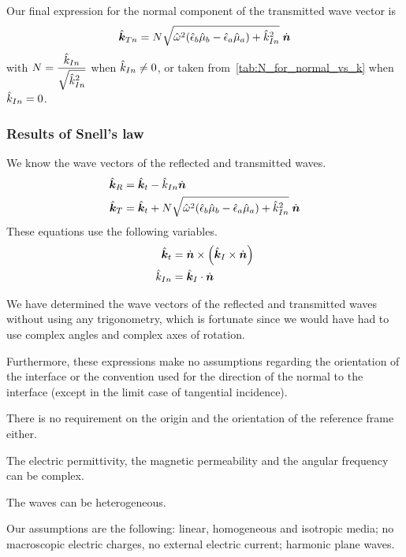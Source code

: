 Our final expression for the normal component of the transmitted wave vector is
\begin{equation}
    \hat{\bm{k}}_{T n} =
    N
    \sqrt{\hat{\omega}^2 (\hat{\epsilon}_b \hat{\mu}_b - \hat{\epsilon}_a \hat{\mu}_a) + \hat{k}_{I n}^2}
    \;
    \dot{\bm{n}}
\end{equation}
with $N=\dfrac{\hat{k}_{I n}}{\sqrt{\hat{k}_{I n}^2}}$ when $\hat{k}_{I n} \neq 0$, or taken from~\cref{tab:N_for_normal_vs_k} when $\hat{k}_{I n} = 0$.


\subsubsection{Results of Snell's law}
\label{sec:result_snells_law}
We know the wave vectors of the reflected and transmitted waves.
\begin{align}
    \hat{\bm{k}}_R
    &=
    \hat{\bm{k}}_t
    -\hat{k}_{I n}
    \dot{\bm{n}}
    \label{eq:snell_reflection}
    \\
    \hat{\bm{k}}_T
    &=
    \hat{\bm{k}}_t
    +
    N
    \sqrt{\hat{\omega}^2 (\hat{\epsilon}_b \hat{\mu}_b - \hat{\epsilon}_a \hat{\mu}_a) + \hat{k}_{I n}^2}
    \;
    \dot{\bm{n}}
    \label{eq:snell_transmission}
\end{align}
These equations use the following variables.
\begin{align}
    \vectcp{k}_t &= \vectu{n} \times \left(\vectcp{k}_\I \times \vectu{n} \right)
    \\
    \cp{k}_{\I n} &= \vectcp{k}_\I \cdot \vectu{n}
\end{align}

We have determined the wave vectors of the reflected and transmitted waves without using any trigonometry, which is fortunate since we would have had to use complex angles and complex axes of rotation.

Furthermore, these expressions make no assumptions regarding the orientation of the interface or the convention used for the direction of the normal to the interface (except in the limit case of tangential incidence).

There is no requirement on the origin and the orientation of the reference frame either.

The electric permittivity, the magnetic permeability and the angular frequency can be complex.

The waves can be heterogeneous.

Our assumptions are the following:
linear, homogeneous and isotropic media;
no macroscopic electric charges, no external electric current;
harmonic plane waves.

